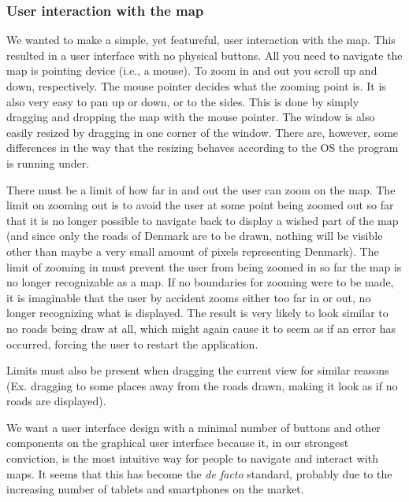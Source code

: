 \documentclass[a4paper,11pt]{article}
\begin{document}
\subsubsection{User interaction with the map}
We wanted to make a simple, yet featureful, user interaction with the map. This resulted in a user interface with no physical buttons. All you need to navigate the map is pointing device (i.e., a mouse). To zoom in and out you scroll up and down, respectively. The mouse pointer decides what the zooming point is. It is also very easy to pan up or down, or to the sides. This is done by simply dragging and dropping the map with the mouse pointer. The window is also easily resized by dragging in one corner of the window. There are, however, some differences in the way that the resizing behaves according to the OS the program is running under.

There must be a limit of how far in and out the user can zoom on the map. The limit on zooming out is to avoid the user at some point being zoomed out so far that it is no longer possible to navigate back to display a wished part of the map (and since only the roads of Denmark are to be drawn, nothing will be visible other than maybe a very small amount of pixels representing Denmark). The limit of zooming in must prevent the user from being zoomed in so far the map is no longer recognizable as a map. If no boundaries for zooming were to be made, it is imaginable that the user by accident zooms either too far in or out, no longer recognizing what is displayed. The result is very likely to look similar to no roads being draw at all, which might again cause it to seem as if an error has occurred, forcing the user to restart the application.

Limits must also be present when dragging the current view for similar reasons (Ex. dragging to some places away from the roads drawn, making it look as if no roads are displayed).

We want a user interface design with a minimal number of buttons and other components on the graphical user interface because it, in our strongest conviction, is the most intuitive way for people to navigate and interact with maps. It seems that this has become the \textit{de facto} standard, probably due to the increasing number of tablets and smartphones on the market.
\end{document}
